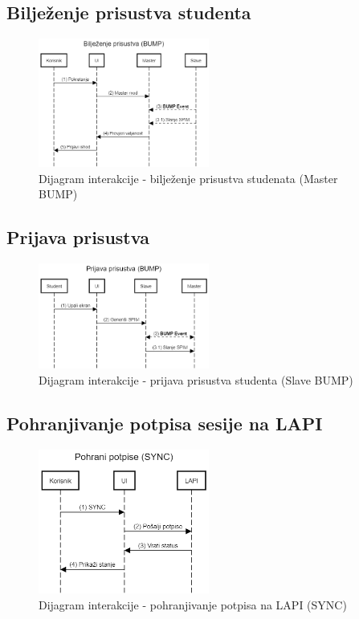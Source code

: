 \subsection*{Bilježenje prisustva studenta}
\begin{figure}[H]
    \centering
    \includegraphics[width=0.5\textwidth]{material/dia/02_bump}
    \caption{Dijagram interakcije - bilježenje prisustva studenata (Master BUMP)}
\end{figure}

\subsection*{Prijava prisustva}
\begin{figure}[H]
    \centering
    \includegraphics[width=0.5\textwidth]{material/dia/03_prijava}
    \caption{Dijagram interakcije - prijava prisustva studenta (Slave BUMP)}
\end{figure}

\subsection*{Pohranjivanje potpisa sesije na LAPI}
\begin{figure}[H]
    \centering
    \includegraphics[width=0.5\textwidth]{material/dia/04_sync}
    \caption{Dijagram interakcije - pohranjivanje potpisa na LAPI (SYNC)}
\end{figure}

